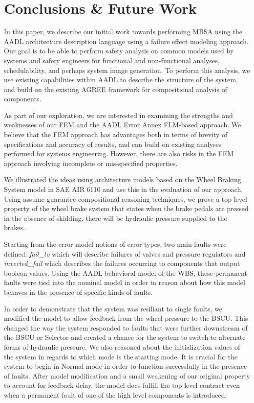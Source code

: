 \section{Conclusions \& Future Work}
In this paper, we describe our initial work towards performing MBSA using the AADL architecture description language using a failure effect modeling approach.  Our goal is to be able to perform safety analysis on common models used by systems and safety engineers for functional and non-functional analyses, schedulability, and perhaps system image generation.  To perform this analysis, we use existing capabilities within AADL to describe the structure of the system, and build on the existing AGREE framework for compositional analysis of components.  

As part of our exploration, we are interested in examining the strengths and weaknesses of our FEM and the AADL Error Annex FLM-based approach.  We believe that the FEM approach has advantages both in terms of brevity of specifications and accuracy of results, and can build on existing analyses performed for systems engineering.  However, there are also risks in the FEM approach involving incomplete or mis-specified properties.  

We illustrated the ideas using architecture models based on the Wheel Braking System model in SAE AIR 6110 \cite{AIR6110} and use this in the evaluation of our approach. Using assume-guarantee compositional reasoning techniques, we prove a top level property of the wheel brake system that states when the brake pedals are pressed in the absence of skidding, there will be hydraulic pressure supplied to the brakes.  

Starting from the error model notions of error types, two main faults were defined: \textit{fail\_to} which will describe failures of valves and pressure regulators and \textit{inverted\_fail} which describes the failures occurring to components that output boolean values. Using the AADL behavioral model of the WBS, these permanent faults were tied into the nominal model in order to reason about how this model behaves in the presence of specific kinds of faults.

In order to demonstrate that the system was resiliant to single faults, we modified the model to allow feedback from the wheel pressure to the BSCU.   This changed the way the system responded to faults that were further downstream of the BSCU or Selector and created a chance for the system to switch to alternate forms of hydraulic pressure. We also reasoned about the initialization values of the system in regards to which mode is the starting mode. It is crucial for the system to begin in Normal mode in order to function successfully in the presence of faults.  After model modification and a small weakening of our original property to account for feedback delay, the model does fulfill the top level contract even when a permanent fault of one of the high level components is introduced.

